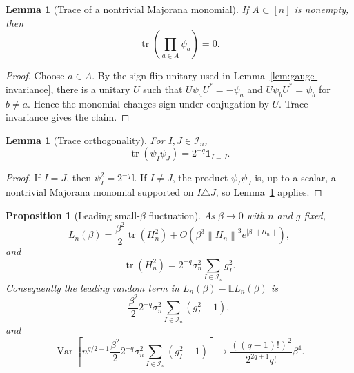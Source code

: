 \documentclass[11pt]{article}
\newtheorem{lemma}[theorem]{Lemma}
\newtheorem{proposition}[theorem]{Proposition}
\newcommand{\E}{\mathbb{E}}
\newcommand{\Var}{\operatorname{Var}}
\newcommand{\tr}{\operatorname{tr}}
\newcommand{\I}{\mathbb{I}}
\newcommand{\calI}{\mathcal{I}}
\newcommand{\ind}{\mathbf{1}}
\newcommand{\norm}[1]{\left\lVert #1\right\rVert}
\begin{document}
\begin{lemma}[Trace of a nontrivial Majorana monomial]\label{lem:trace-monomial-zero}
  If $A\subset[n]$ is nonempty, then
  \begin{equation}\label{eq:trace-monomial-zero}
    \tr\left(\prod_{a\in A}\psi_a\right)=0.
  \end{equation}
\end{lemma}

\begin{proof}
  Choose $a\in A$.  By the sign-flip unitary used in
  Lemma~\ref{lem:gauge-invariance}, there is a unitary $U$ such that
  $U\psi_aU^*=-\psi_a$ and $U\psi_bU^*=\psi_b$ for $b\neq a$.  Hence the
  monomial changes sign under conjugation by $U$.  Trace invariance gives the
  claim.
\end{proof}

\begin{lemma}[Trace orthogonality]\label{lem:trace-orth}
  For $I,J\in\calI_n$,
  \begin{equation}\label{eq:trace-orth}
    \tr(\psi_I\psi_J)=2^{-q}\ind_{I=J}.
  \end{equation}
\end{lemma}

\begin{proof}
  If $I=J$, then $\psi_I^2=2^{-q}\I$.  If $I\neq J$, the product
  $\psi_I\psi_J$ is, up to a scalar, a nontrivial Majorana monomial supported
  on $I\triangle J$, so Lemma~\ref{lem:trace-monomial-zero} applies.
\end{proof}

\begin{proposition}[Leading small-$\beta$ fluctuation]\label{prop:small-beta}
  As $\beta\to0$ with $n$ and $g$ fixed,
  \begin{equation}\label{eq:small-beta-expansion}
    L_n(\beta)
    =
    \frac{\beta^2}{2}\tr(H_n^2)
    +
    O\left(\beta^3\norm{H_n}^3e^{|\beta|\norm{H_n}}\right),
  \end{equation}
  and
  \begin{equation}\label{eq:tr-H2}
    \tr(H_n^2)=2^{-q}\sigma_n^2\sum_{I\in\calI_n}g_I^2.
  \end{equation}
  Consequently the leading random term in $L_n(\beta)-\E L_n(\beta)$ is
  \begin{equation}\label{eq:leading-random-term}
    \frac{\beta^2}{2}2^{-q}\sigma_n^2
    \sum_{I\in\calI_n}(g_I^2-1),
  \end{equation}
  and
  \begin{equation}\label{eq:small-beta-variance}
    \Var\left[
      n^{q/2-1}
      \frac{\beta^2}{2}2^{-q}\sigma_n^2
      \sum_{I\in\calI_n}(g_I^2-1)
    \right]
    \to
    \frac{((q-1)!)^2}{2^{2q+1}q!}\beta^4.
  \end{equation}
\end{proposition}
\end{document}
